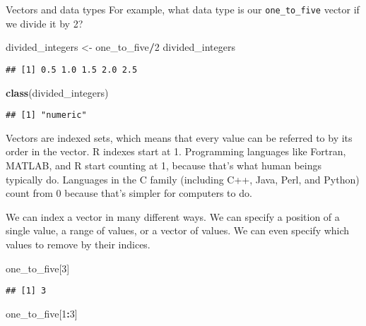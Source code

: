 \documentclass[
  11pt,
  ignorenonframetext,
]{beamer}
\newenvironment{Shaded}{\begin{snugshade}}{\end{snugshade}}
\newcommand{\DecValTok}[1]{\textcolor[rgb]{0.00,0.00,0.81}{#1}}
\newcommand{\KeywordTok}[1]{\textcolor[rgb]{0.13,0.29,0.53}{\textbf{#1}}}
\newcommand{\NormalTok}[1]{#1}
\newcommand{\OperatorTok}[1]{\textcolor[rgb]{0.81,0.36,0.00}{\textbf{#1}}}
\newcommand{\StringTok}[1]{\textcolor[rgb]{0.31,0.60,0.02}{#1}}
\begin{document}
\begin{frame}[fragile]{Vectors and data types}
For example, what data type is our \texttt{one\_to\_five} vector if we
divide it by 2?

\begin{Shaded}
\begin{Highlighting}[]
\NormalTok{divided_integers <-}\StringTok{ }\NormalTok{one_to_five}\OperatorTok{/}\DecValTok{2}
\NormalTok{divided_integers}
\end{Highlighting}
\end{Shaded}

\begin{verbatim}
## [1] 0.5 1.0 1.5 2.0 2.5
\end{verbatim}

\begin{Shaded}
\begin{Highlighting}[]
\KeywordTok{class}\NormalTok{(divided_integers)}
\end{Highlighting}
\end{Shaded}

\begin{verbatim}
## [1] "numeric"
\end{verbatim}

Vectors are indexed sets, which means that every value can be referred
to by its order in the vector. R indexes start at 1. Programming
languages like Fortran, MATLAB, and R start counting at 1, because
that's what human beings typically do. Languages in the C family
(including C++, Java, Perl, and Python) count from 0 because that's
simpler for computers to do.

We can index a vector in many different ways. We can specify a position
of a single value, a range of values, or a vector of values. We can even
specify which values to remove by their indices.

\begin{Shaded}
\begin{Highlighting}[]
\NormalTok{one_to_five[}\DecValTok{3}\NormalTok{]}
\end{Highlighting}
\end{Shaded}

\begin{verbatim}
## [1] 3
\end{verbatim}

\begin{Shaded}
\begin{Highlighting}[]
\NormalTok{one_to_five[}\DecValTok{1}\OperatorTok{:}\DecValTok{3}\NormalTok{]}
\end{Highlighting}
\end{Shaded}


\end{frame}
\end{document}

